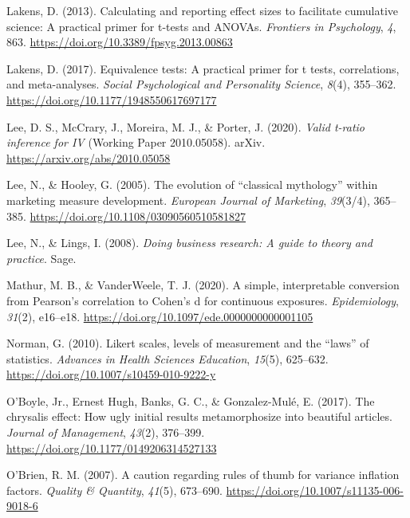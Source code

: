 \documentclass[
]{book}
\newlength{\cslhangindent}
\newenvironment{CSLReferences}[2] %
 {\begin{list}{}{%
  \setlength{\itemindent}{0pt}
  \setlength{\leftmargin}{0pt}
  \setlength{\parsep}{0pt}
  \ifodd #1
   \setlength{\leftmargin}{\cslhangindent}
   \setlength{\itemindent}{-1\cslhangindent}
  \fi
  \setlength{\itemsep}{#2\baselineskip}}}
 {\end{list}}
\begin{document}
\begin{CSLReferences}{1}{0}
Lakens, D. (2013). Calculating and reporting effect sizes to facilitate cumulative science: A practical primer for t-tests and {ANOVAs}. \emph{Frontiers in Psychology}, \emph{4}, 863. \url{https://doi.org/10.3389/fpsyg.2013.00863}

Lakens, D. (2017). Equivalence tests: A practical primer for t tests, correlations, and meta-analyses. \emph{Social Psychological and Personality Science}, \emph{8}(4), 355--362. \url{https://doi.org/10.1177/1948550617697177}

Lee, D. S., McCrary, J., Moreira, M. J., \& Porter, J. (2020). \emph{Valid t-ratio inference for {IV}} (Working Paper 2010.05058). arXiv. \url{https://arxiv.org/abs/2010.05058}

Lee, N., \& Hooley, G. (2005). The evolution of {``classical mythology''} within marketing measure development. \emph{European Journal of Marketing}, \emph{39}(3/4), 365--385. \url{https://doi.org/10.1108/03090560510581827}

Lee, N., \& Lings, I. (2008). \emph{Doing business research: A guide to theory and practice}. Sage.

Mathur, M. B., \& VanderWeele, T. J. (2020). A simple, interpretable conversion from {P}earson's correlation to {C}ohen's d for continuous exposures. \emph{Epidemiology}, \emph{31}(2), e16--e18. \url{https://doi.org/10.1097/ede.0000000000001105}

Norman, G. (2010). Likert scales, levels of measurement and the {``laws''} of statistics. \emph{Advances in Health Sciences Education}, \emph{15}(5), 625--632. \url{https://doi.org/10.1007/s10459-010-9222-y}

O'Boyle, Jr., Ernest Hugh, Banks, G. C., \& Gonzalez-Mulé, E. (2017). The chrysalis effect: How ugly initial results metamorphosize into beautiful articles. \emph{Journal of Management}, \emph{43}(2), 376--399. \url{https://doi.org/10.1177/0149206314527133}

O'Brien, R. M. (2007). A caution regarding rules of thumb for variance inflation factors. \emph{Quality \& Quantity}, \emph{41}(5), 673--690. \url{https://doi.org/10.1007/s11135-006-9018-6}


\end{CSLReferences}
\end{document}
